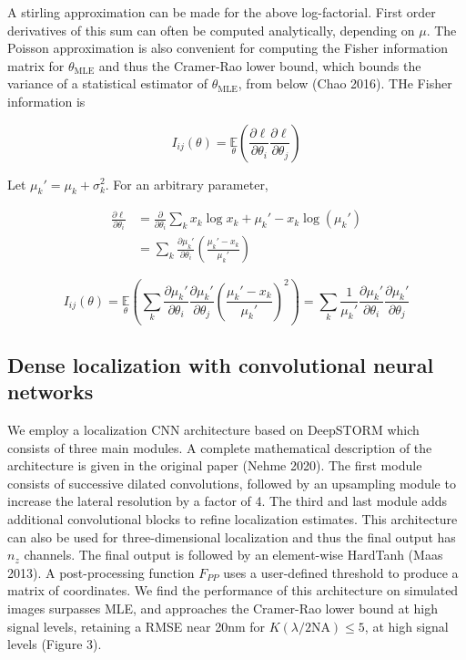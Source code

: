 \documentclass{ucetd}
\begin{document}
A stirling approximation can be made for the above log-factorial. First order derivatives of this sum can often be computed analytically, depending on $\mu$. The Poisson approximation is also convenient for computing the Fisher information matrix for $\theta_{\mathrm{MLE}}$ and thus the Cramer-Rao lower bound, which bounds the variance of a statistical estimator of $\theta_{\mathrm{MLE}}$, from below (Chao 2016). THe Fisher information is

\begin{equation}
I_{ij}(\theta) = \underset{\theta}{\mathbb{E}}\left(\frac{\partial \ell}{\partial\theta_{i}}\frac{\partial\ell}{\partial\theta_{j}}\right) 
\end{equation}

Let $\mu_{k}' = \mu_{k} + \sigma_{k}^{2}$. For an arbitrary parameter,

\begin{align*}
\frac{\partial \ell}{\partial \theta_{i}} &= \frac{\partial}{\partial \theta_{i}} \sum_{k}  x_{k}\log x_{k} + \mu_{k}' - x_{k}\log\left(\mu_{k}'\right)\\
&= \sum_{k} \frac{\partial \mu_{k}'}{\partial\theta_{i}} \left(\frac{\mu_{k}'-x_{k}}{\mu_{k}'}\right)
\end{align*}

\begin{equation*}
I_{ij}(\theta) = \underset{\theta}{\mathbb{E}}\left(\sum_{k}\frac{\partial \mu_{k}'}{\partial\theta_{i}}\frac{\partial \mu_{k}'}{\partial\theta_{j}} \left(\frac{\mu_{k}'-x_{k}}{\mu_{k}'}\right)^{2}\right) = \sum_{k}\frac{1}{\mu_{k}'}\frac{\partial \mu_{k}'}{\partial\theta_{i}}\frac{\partial \mu_{k}'}{\partial\theta_{j}}
\end{equation*}

\subsection{Dense localization with convolutional neural networks}

We employ a localization CNN architecture based on DeepSTORM which consists of three main modules. A complete mathematical description of the architecture is given in the original paper (Nehme 2020). The first module consists of successive dilated convolutions, followed by an upsampling module to increase the lateral resolution by a factor of 4. The third and last module adds additional convolutional blocks to refine localization estimates. This architecture can also be used for three-dimensional localization and thus the final output has $n_{z}$ channels. The final output is followed by an element-wise HardTanh (Maas 2013). A post-processing function $F_{PP}$ uses a user-defined threshold to produce a matrix of coordinates. We find the performance of this architecture on simulated images surpasses MLE, and approaches the Cramer-Rao lower bound at high signal levels, retaining a RMSE near 20nm for $K(\lambda/2\mathrm{NA}) \leq 5$, at high signal levels (Figure 3). 
\end{document}
